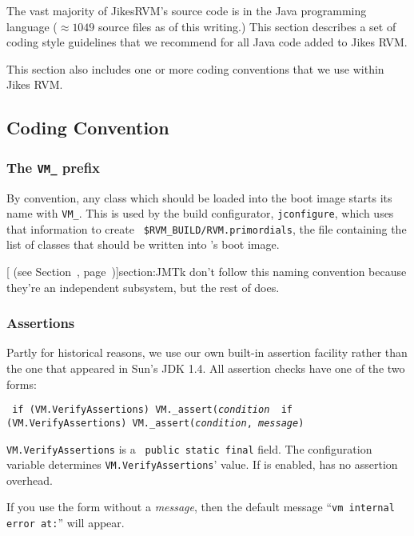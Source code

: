 The vast majority of Jikes\TMweb RVM's source code is in the Java\TMweb
programming language ($\approx 1049$
source files as of this writing.)  This section describes a set of
coding style guidelines that we recommend for all Java code added to
Jikes RVM.\@

This section also includes one or more coding conventions that we
use within Jikes RVM.\@  

\subsection{Coding Convention}

\subsubsection{The {\tt VM\_} prefix}

By convention, any class which should be loaded into the boot image
starts its name with {\tt VM\_}.  This is used by the build configurator,
{\tt jconfigure}, which uses that information to create {\tt
\$RVM\-\_\-BUILD\-/\-R\-V\-M\-.pri\-mor\-di\-als}, the file containing the list of classes
that should be written into \jrvm{}'s  boot image.

[ (see Section~\Ref, page~\Pageref)]{section:JMTk} don't follow this naming convention
because they're an independent subsystem, but the rest of \jrvm{} does.

\subsubsection{Assertions}
\label{assertions}

Partly for historical reasons, we use our own built-in assertion
facility rather than the one that appeared in Sun\Rweb{}'s JDK 1.4.   All
assertion checks have one of the two forms:
\begin{example}
\tt{}    if (VM.VerifyAssertions)  VM._assert({\it condition}
\tt{}    if (VM.VerifyAssertions)  VM._assert({\it condition}, {\it message})
\end{example}
{\tt VM.VerifyAssertions} is a {\tt 
public static final} field.  The 
configuration variable determines {\tt VM.VerifyAssertions}' value.
If  is enabled, \jrvm{} has no assertion
overhead. 

If you use the form without a {\it message}, then the default message
``{\tt vm internal error at:}''  will appear.  


